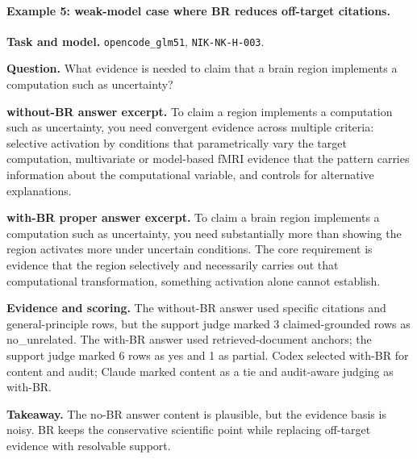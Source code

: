 {\medskip

\paragraph{Example 5: weak-model case where BR reduces off-target citations.}
\textbf{Task and model.} \texttt{opencode\_glm51}, \texttt{NIK-NK-H-003}.

\textbf{Question.} What evidence is needed to claim that a brain region implements a computation such as uncertainty?

\textbf{without-BR answer excerpt.} To claim a region implements a computation such as uncertainty, you need convergent evidence across multiple criteria: selective activation by conditions that parametrically vary the target computation, multivariate or model-based fMRI evidence that the pattern carries information about the computational variable, and controls for alternative explanations.

\textbf{with-BR proper answer excerpt.} To claim a brain region implements a computation such as uncertainty, you need substantially more than showing the region activates more under uncertain conditions. The core requirement is evidence that the region selectively and necessarily carries out that computational transformation, something activation alone cannot establish.

\textbf{Evidence and scoring.} The without-BR answer used specific citations and general-principle rows, but the support judge marked 3 claimed-grounded rows as no\_unrelated. The with-BR answer used retrieved-document anchors; the support judge marked 6 rows as yes and 1 as partial. Codex selected with-BR for content and audit; Claude marked content as a tie and audit-aware judging as with-BR.

\textbf{Takeaway.} The no-BR answer content is plausible, but the evidence basis is noisy. BR keeps the conservative scientific point while replacing off-target evidence with resolvable support.
}
